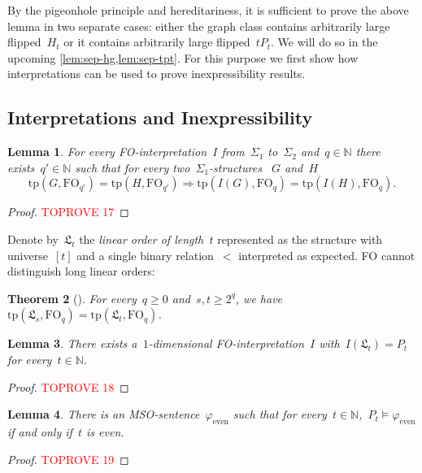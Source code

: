 \documentclass[11pt]{article}      \usepackage[margin=1in]{geometry}  \usepackage{microtype}
\newtheorem{theorem}{Theorem}[section]
\newtheorem{lemma}[theorem]{Lemma}
\theoremstyle{definition}
\newcommand{\N}[0]{\mathrm{\mathbb{N}}}
\newcommand{\tp}{\mathrm{tp}}
\renewcommand{\phi}{\varphi}
\newcommand{\FO}{\mathrm{FO}}
\newcommand{\struc}[1]{\mathfrak{#1}}
\renewcommand{\ge}{\geqslant}
\renewcommand{\geq}{\ge}
\begin{document}
By the pigeonhole principle and hereditariness, it is sufficient to prove
the above lemma in two separate cases:
either the graph class contains arbitrarily large flipped~$H_t$ or it contains arbitrarily large flipped~$tP_t$.
We will do so in the upcoming \cref{lem:sep-hg,lem:sep-tpt}.
For this purpose we first show how interpretations can be used to prove inexpressibility results.





\subsection{Interpretations and Inexpressibility}

\begin{lemma}\label{lem:interp-type}
    For every FO-interpretation~$I$ from~$\Sigma_1$ to~$\Sigma_2$ and~$q \in \N$ there exists~$q' \in \N$ such that for every two~$\Sigma_1$-structures
   ~$G$ and~$H$
    \[
        \tp(G,\FO_{q'}) = \tp(H,\FO_{q'}) \Rightarrow 
        \tp(I(G),\FO_{q}) = \tp(I(H),\FO_{q}). 
    \]
\end{lemma}
\begin{proof}\textcolor{red}{TOPROVE 17}\end{proof}

Denote by~$\struc L_t$ the \emph{linear order of length~$t$} represented as the structure with universe~$[t]$ and a single binary relation~$<$ interpreted as expected.
FO cannot distinguish long linear orders:

\begin{theorem}[{\cite[Thm.\ 3.6]{libkin2004elements}}]
    For every~$q \geq 0$ and~$s,t \geq 2^q$, we have~$\tp(\struc L_{s}, \FO_q) = \tp(\struc L_{t}, \FO_q)$.
\end{theorem}

\begin{lemma}\label{lem:interp-order-to-path}
    There exists a~$1$-dimensional FO-interpretation~$I$ with~$I(\struc L_t) = P_t$ for every~$t\in \N$.
\end{lemma}
\begin{proof}\textcolor{red}{TOPROVE 18}\end{proof}



\newcommand{\even}{\phi_{\mathrm{even}}}
\newcommand{\sameparity}{\phi_{\mathrm{sameParity}}}

\begin{lemma}\label{lem:even}
    There is an MSO-sentence~$\even$ such that for every~$t \in \N$,~$P_t\models \even$ if and only if~$t$ is even.
\end{lemma}
\begin{proof}\textcolor{red}{TOPROVE 19}\end{proof}
\end{document}
